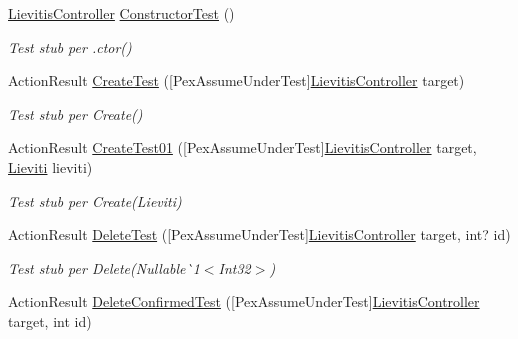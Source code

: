 \begin{DoxyCompactItemize}
\item 
\mbox{\hyperlink{class_brew_day2_1_1_controllers_1_1_lievitis_controller}{Lievitis\+Controller}} \mbox{\hyperlink{class_brew_day2_1_1_controllers_1_1_tests_1_1_lievitis_controller_test_a5547cf57919fc4c31be9fc8e310add61}{Constructor\+Test}} ()
\begin{DoxyCompactList}\small\item\em Test stub per .ctor()\end{DoxyCompactList}\item 
Action\+Result \mbox{\hyperlink{class_brew_day2_1_1_controllers_1_1_tests_1_1_lievitis_controller_test_a1bcac3b24333a2638f1f3c4f66d2969b}{Create\+Test}} (\mbox{[}Pex\+Assume\+Under\+Test\mbox{]}\mbox{\hyperlink{class_brew_day2_1_1_controllers_1_1_lievitis_controller}{Lievitis\+Controller}} target)
\begin{DoxyCompactList}\small\item\em Test stub per Create()\end{DoxyCompactList}\item 
Action\+Result \mbox{\hyperlink{class_brew_day2_1_1_controllers_1_1_tests_1_1_lievitis_controller_test_a0e016949ef6e991633a5bde9978cad29}{Create\+Test01}} (\mbox{[}Pex\+Assume\+Under\+Test\mbox{]}\mbox{\hyperlink{class_brew_day2_1_1_controllers_1_1_lievitis_controller}{Lievitis\+Controller}} target, \mbox{\hyperlink{class_brew_day2_1_1_models_1_1_lieviti}{Lieviti}} lieviti)
\begin{DoxyCompactList}\small\item\em Test stub per Create(\+Lieviti)\end{DoxyCompactList}\item 
Action\+Result \mbox{\hyperlink{class_brew_day2_1_1_controllers_1_1_tests_1_1_lievitis_controller_test_a7e36b387b7d84257ff35ed5408a66b6a}{Delete\+Test}} (\mbox{[}Pex\+Assume\+Under\+Test\mbox{]}\mbox{\hyperlink{class_brew_day2_1_1_controllers_1_1_lievitis_controller}{Lievitis\+Controller}} target, int? id)
\begin{DoxyCompactList}\small\item\em Test stub per Delete(Nullable\`{}1$<$Int32$>$)\end{DoxyCompactList}\item 
Action\+Result \mbox{\hyperlink{class_brew_day2_1_1_controllers_1_1_tests_1_1_lievitis_controller_test_a4f83b230e58b4f43bf1439f2de669f3a}{Delete\+Confirmed\+Test}} (\mbox{[}Pex\+Assume\+Under\+Test\mbox{]}\mbox{\hyperlink{class_brew_day2_1_1_controllers_1_1_lievitis_controller}{Lievitis\+Controller}} target, int id)

\end{DoxyCompactItemize}
